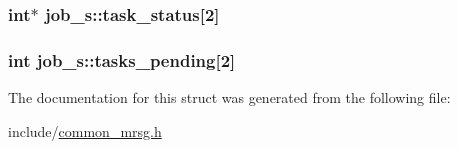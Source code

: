 \hypertarget{structjob__s_a25c05f7bc2c55b8626a947c42fbea207}{
\subsubsection[{task\-\_\-status}]{\setlength{\rightskip}{0pt plus 5cm}int$\ast$ {\bf job\-\_\-s\-::task\-\_\-status}\mbox{[}2\mbox{]}}}\label{structjob__s_a25c05f7bc2c55b8626a947c42fbea207}
\hypertarget{structjob__s_a2121f93a58679fe228efdefe7bdcd1ba}{
\subsubsection[{tasks\-\_\-pending}]{\setlength{\rightskip}{0pt plus 5cm}int {\bf job\-\_\-s\-::tasks\-\_\-pending}\mbox{[}2\mbox{]}}}\label{structjob__s_a2121f93a58679fe228efdefe7bdcd1ba}


\-The documentation for this struct was generated from the following file\-:\begin{DoxyCompactItemize}
\item 
include/\hyperlink{common__mrsg_8h}{common\-\_\-mrsg.\-h}\end{DoxyCompactItemize}
